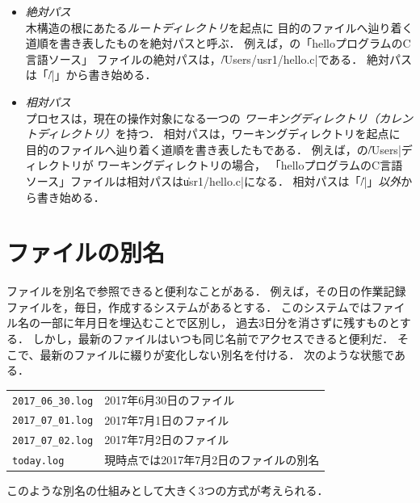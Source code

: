 \begin{itemize}
\item \emph{絶対パス} \\
  木構造の根にあたる\emph{ルートディレクトリ}を起点に
  目的のファイルへ辿り着く道順を書き表したものを絶対パスと呼ぶ．
  例えば，の「helloプログラムのC言語ソース」
  ファイルの絶対パスは，\|/Users/usr1/hello.c|である．
  絶対パスは「\|/|」から書き始める．

\item \emph{相対パス} \\
  プロセスは，現在の操作対象になる一つの
  \emph{ワーキングディレクトリ（カレントディレクトリ）}を持つ．
  相対パスは，ワーキングディレクトリを起点に
  目的のファイルへ辿り着く道順を書き表したもである．
  例えば，の\|/Users|ディレクトリが
  ワーキングディレクトリの場合，
  「helloプログラムのC言語ソース」ファイルは相対パスは\|usr1/hello.c|になる．
  相対パスは「\|/|」\emph{以外}から書き始める．
\end{itemize}

\section{ファイルの別名}
ファイルを別名で参照できると便利なことがある．
例えば，その日の作業記録ファイルを，毎日，作成するシステムがあるとする．
このシステムではファイル名の一部に年月日を埋込むことで区別し，
過去3日分を消さずに残すものとする．
しかし，最新のファイルはいつも同じ名前でアクセスできると便利だ．
そこで、最新のファイルに綴りが変化しない別名を付ける．
次のような状態である．

\begin{center}
  \begin{tabular}{l l}
    \texttt{2017\_06\_30.log}   & 2017年6月30日のファイル \\
    \texttt{2017\_07\_01.log}   & 2017年7月1日のファイル  \\
    \texttt{2017\_07\_02.log}   & 2017年7月2日のファイル  \\
    \texttt{today.log}          & 現時点では2017年7月2日のファイルの別名
  \end{tabular}
\end{center}

このような別名の仕組みとして大きく3つの方式が考えられる．

